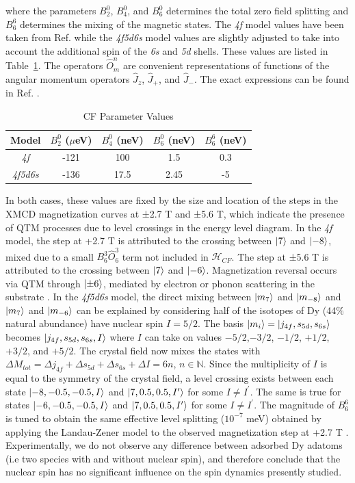 \documentclass[reprint,amsmath,amssymb,aps,nofootinbib,onecolumn]{revtex4-2}
\begin{document}
where the parameters $B^{0}_{2}$, $B^{0}_{4}$, and $B^{0}_{6}$ determines the total zero field splitting and $B^{6}_{6}$ determines the mixing of the magnetic states. The \textit{4f} model values have been taken from Ref.\cite{baltic2018} while the \textit{4f5d6s} model values are slightly adjusted to take into account the additional spin of the \textit{6s} and \textit{5d} shells. These values are listed in Table~\ref{table:CF}. The operators $\hat{O}^{n}_{m}$ are convenient representations of functions of the angular momentum operators $\hat{J}_z$, $\hat{J}_+$, and $\hat{J}_-$. The exact expressions can be found in Ref. \cite{HUTCHINGS1964}. 
\begin{table}[h!]
\centering
 \begin{tabular}{|c||c|c|c|c|}
 \hline
 Model & $B^{0}_{2}$ ($\mu$eV) & $B^{0}_{4}$ (neV) & $B^{0}_{6}$ (neV) & $B^{6}_{6}$ (neV) 
 \\ [1ex] 
 \hline 
 \hline 
 \textit{4f} & -121 & 100 & 1.5 & 0.3 \\
 \hline
  \textit{4f5d6s} & -136 & 17.5 & 2.45 & -5 \\
 \hline
 \end{tabular}
 \caption{CF Parameter Values}
 \label{table:CF}
\end{table}
In both cases, these values are fixed by the size and location of the steps in the XMCD magnetization curves at ±2.7 T and ±5.6 T, which indicate the presence of QTM processes due to level crossings in the energy level diagram. In the \textit{4f} model, the step at +2.7 T is attributed to the crossing between $\ket{7}$ and $\ket{-8}$, mixed due to a small $B^{3}_{6} \hat{O}^{3}_{6}$ term not included in $\mathcal{H}_{CF}$. The step at ±5.6 T is attributed to the crossing between $\ket{7}$ and $\ket{-6}$. Magnetization reversal occurs via QTM through $\ket{\pm 6}$, mediated by electron or phonon scattering in the substrate \cite{baltic2018,baltic2016}. In the \textit{4f5d6s} model, the direct mixing between $\ket{m_7}$ and $\ket{m_{-8}}$ and $\ket{m_7}$ and $\ket{m_{-6}}$ can be explained by considering half of the isotopes of Dy (44$\%$ natural abundance) have nuclear spin $I = 5/2$. The basis $\ket{m_i}=\ket{j_{4f},s_{5d},s_{6s}}$ becomes $\ket{j_{4f},s_{5d},s_{6s},I}$ where $I$ can take on values $-5/2$,$-3/2$, $-1/2$, $+1/2$, $+3/2$, and $+5/2$. The crystal field now mixes the states with $\Delta M_{tot}=\Delta j_{4f} + \Delta s_{5d} + \Delta s_{6s} + \Delta I=6n$, $n\in \mathbb{N}$. Since the multiplicity of $I$ is equal to the symmetry of the crystal field, a level crossing exists between each state $\ket{-8,-0.5,-0.5,I}$ and $\ket{7,0.5,0.5,I^\prime}$ for some $I \ne I^\prime$. The same is true for states $\ket{-6,-0.5,-0.5,I}$ and $\ket{7,0.5,0.5,I^\prime}$ for some $I \ne I^\prime$. The magnitude of $B^{6}_{6}$ is tuned to obtain the same effective level splitting ($10^{-7}$ meV) obtained by applying the Landau-Zener model to the observed magnetization step at +2.7 T \cite{baltic2016, zener1932}. Experimentally, we do not observe any difference between adsorbed Dy adatoms (i.e two species with and without nuclear spin), and therefore conclude that the nuclear spin has no significant influence on the spin dynamics presently studied. \par
\end{document}

